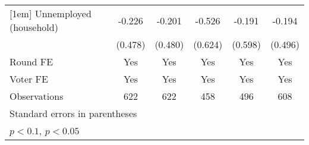\begin{table}[htbp]
\begin{tabular}{l*{5}{c}}
[1em]
Unnemployed (household)&      -0.226       &      -0.201       &      -0.526       &      -0.191       &      -0.194       \\
                    &     (0.478)       &     (0.480)       &     (0.624)       &     (0.598)       &     (0.496)       \\
[1em]
\hline  Round FE    &         Yes       &         Yes       &         Yes       &         Yes       &         Yes       \\
[1em]
Voter FE            &         Yes       &         Yes       &         Yes       &         Yes       &         Yes       \\
\hline
Observations        &         622       &         622       &         458       &         496       &         608       \\
\hline\hline
\multicolumn{6}{l}{\footnotesize Standard errors in parentheses}\\
\multicolumn{6}{l}{\footnotesize \sym{+} \(p<0.1\), \sym{*} \(p<0.05\)}\\
\end{tabular}
\end{table}
